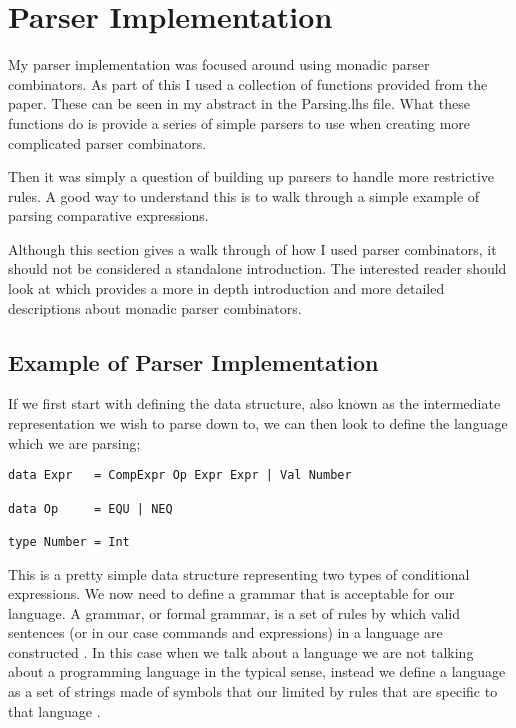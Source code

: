\section{Parser Implementation}

My parser implementation was focused around using monadic parser combinators. As part of this I used a collection of functions provided from the paper. %
These can be seen in my abstract in the Parsing.lhs file. What these functions do is provide a series of simple parsers to use when creating more complicated parser combinators. 

Then it was simply a question of building up parsers to handle more restrictive rules. A good way to understand this is to walk through a simple example of parsing comparative expressions. 

Although this section gives a walk through of how I used parser combinators, it should not be considered a standalone introduction. The interested reader should look at %
which provides a more in depth introduction and more detailed descriptions about monadic parser combinators.

\newpage

\subsection{Example of Parser Implementation}

If we first start with defining the data structure, also known as the intermediate representation we wish to parse down to, we can then look to define the language which we are parsing;

\begin{lstlisting}
data Expr 	= CompExpr Op Expr Expr | Val Number
	
data Op		= EQU | NEQ 
	
type Number	= Int 
\end{lstlisting}

This is a pretty simple data structure representing two types of conditional expressions. We now need to define a grammar that is acceptable for our language. A grammar, or formal grammar, is a set of rules by which valid sentences (or in our case commands and expressions) in a language are constructed \footnotemark[1].  In this case when we talk about a language we are not talking about a programming language in the typical sense, instead we define a language as a set of strings made of symbols that our limited by rules that are specific to that language \footnotemark[2]. 

